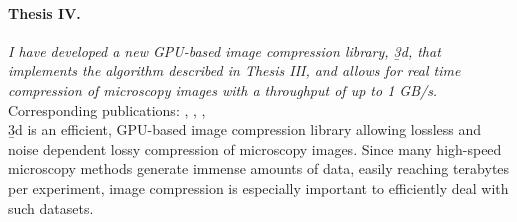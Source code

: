   \paragraph{Thesis IV.} \textit{I have  developed a new GPU-based image compression library, \b3d, that implements the algorithm described in Thesis III, and allows for real time compression of microscopy images with a throughput of up to 1 GB/s.}\\[0.5ex]
    Corresponding publications: \cite{balazs_real-time_2017}, \cite{balazs_gpu-based_2016}, \cite{balazs_gpu-based_2016-1}, \cite{balazs_gpu-based_2017}\\[0.5ex]
    \b3d is an efficient, GPU-based image compression library allowing lossless and noise dependent lossy compression of microscopy images. Since many high-speed microscopy methods generate immense amounts of data, easily reaching terabytes per experiment, image compression is especially important to efficiently deal with such datasets.
